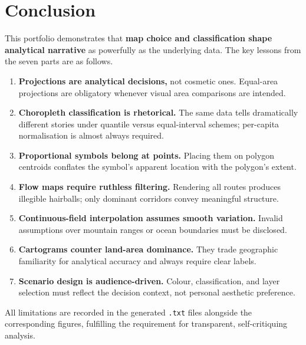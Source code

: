 \documentclass[12pt, a4paper, oneside]{report}
\begin{document}
\chapter{Conclusion}

This portfolio demonstrates that \textbf{map choice and classification shape analytical
narrative} as powerfully as the underlying data. The key lessons from the seven parts
are as follows.

\begin{enumerate}[leftmargin=2em, label=\textcolor{accent}{\bfseries\arabic*.}]
  \item \textbf{Projections are analytical decisions,} not cosmetic ones. Equal-area
        projections are obligatory whenever visual area comparisons are intended.
  \item \textbf{Choropleth classification is rhetorical.} The same data tells
        dramatically different stories under quantile versus equal-interval schemes;
        per-capita normalisation is almost always required.
  \item \textbf{Proportional symbols belong at points.} Placing them on polygon
        centroids conflates the symbol's apparent location with the polygon's extent.
  \item \textbf{Flow maps require ruthless filtering.} Rendering all routes produces
        illegible hairballs; only dominant corridors convey meaningful structure.
  \item \textbf{Continuous-field interpolation assumes smooth variation.} Invalid
        assumptions over mountain ranges or ocean boundaries must be disclosed.
  \item \textbf{Cartograms counter land-area dominance.} They trade geographic
        familiarity for analytical accuracy and always require clear labels.
  \item \textbf{Scenario design is audience-driven.} Colour, classification, and layer
        selection must reflect the decision context, not personal aesthetic preference.
\end{enumerate}

All limitations are recorded in the generated \texttt{.txt} files alongside the
corresponding figures, fulfilling the requirement for transparent, self-critiquing
analysis.
\end{document}
